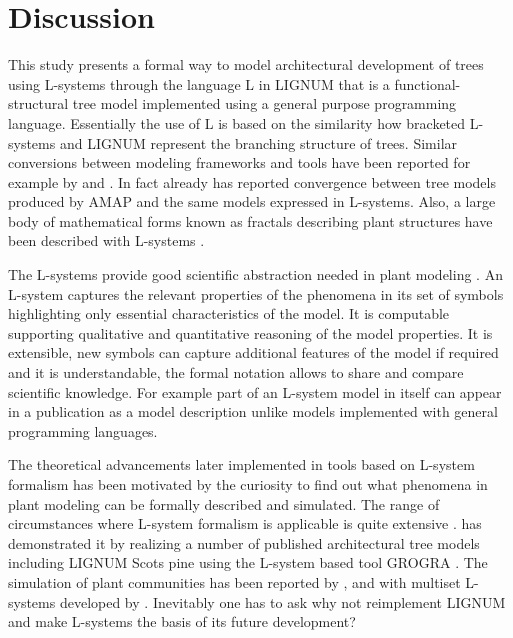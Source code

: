 \section{Discussion}

This study presents a formal way to model architectural development of
trees  using  L-systems  through the  language  L  in  LIGNUM that  is  a
functional-structural tree  model implemented using  a general purpose
programming  language.  Essentially  the  use  of L  is  based on  the
similarity how bracketed L-systems  and LIGNUM represent the branching
structure of  trees.  Similar conversions  between modeling frameworks
and  tools have been  reported for  example by  \citet{ferraro:02} and
\citet{dzierzon:03}.  In fact already \citet{kurth:em94}  has
reported convergence between tree models produced by AMAP and the same
models  expressed in L-systems.   Also, a  large body  of mathematical
forms  known  as  fractals   describing  plant  structures  have  been
described with L-systems \citep{kurth:99}.

The  L-systems provide  good  scientific abstraction  needed in  plant
modeling \citep[c.f.][]{regev:02}.  An  L-system captures the relevant
properties of  the phenomena in  its set of symbols  highlighting only
essential characteristics  of the model.  It  is computable supporting
qualitative and quantitative reasoning of the model properties.  It is
extensible, new  symbols can capture additional features  of the model
if required  and it is  understandable, the formal notation  allows to
share  and  compare scientific  knowledge.   For  example  part of  an
L-system  model in  itself  can appear  in  a publication  as a  model
description  unlike   models  implemented  with   general  programming
languages.

The  theoretical  advancements later  implemented  in  tools based  on
L-system formalism  has been motivated  by the curiosity to  find out
what  phenomena  in  plant  modeling  can be  formally  described  and
simulated.   The range  of circumstances  where L-system  formalism is
applicable  is quite  extensive  \citep{pp:99}.  \citet{kurth:99}  has
demonstrated it by realizing  a number of published architectural tree
models  including  LIGNUM Scots  pine  \citep{perttunen:96} using  the
L-system based tool GROGRA  \citep{kurth:94}. The simulation of plant
communities has been  reported by \citet{deussen:98}, \citet{kurth:99}
and with multiset  L-systems developed by \citet{lane:02}.  Inevitably
one has to ask why not reimplement LIGNUM and make L-systems the basis
of its future development?

